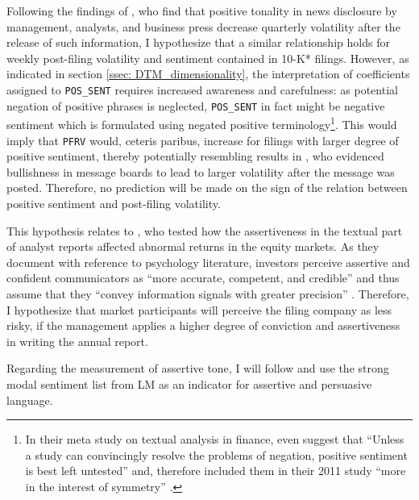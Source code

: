 Following the findings of \textcite{KothariLiShort_2009}, who find that positive tonality in news disclosure by management, analysts, and business press decrease quarterly volatility after the release of such information, I hypothesize that a similar relationship holds for weekly post-filing volatility and sentiment contained in 10-K* filings. However, as indicated in section \ref{ssec: DTM_dimensionality}, the interpretation of coefficients assigned to \texttt{POS\_SENT} requires increased awareness and carefulness: as potential negation of positive phrases is neglected, \texttt{POS\_SENT} in fact might be negative sentiment which is formulated using negated positive terminology\footnote{In their meta study on textual analysis in finance, \textcite{LM-meta-2016} even suggest that \enquote{Unless a study can convincingly resolve the problems of negation, positive sentiment is best left untested} \parencite[1217]{LM-meta-2016} and, therefore included them in their 2011 study \enquote{more in the interest of symmetry} \parencite[45]{Loughran2011}.}. This would imply that \texttt{PFRV} would, ceteris paribus, increase for filings with larger degree of positive sentiment, thereby potentially resembling results in \textcite{AntweilerFrank2004}, who evidenced bullishness in message boards to lead to larger volatility after the message was posted. Therefore, no prediction will be made on the sign of the relation between positive sentiment and post-filing volatility. 


This hypothesis relates to \textcite{HuangZangZheng14}, who tested how the assertiveness in the textual part of analyst reports affected abnormal returns in the equity markets. As they document with reference to psychology literature, investors perceive assertive and confident communicators as \enquote{more accurate, competent, and credible} and thus assume that they \enquote{convey information signals with greater precision} \parencite[2157]{HuangZangZheng14}. Therefore, I hypothesize that market participants will perceive the filing company as less risky, if the management applies a higher degree of conviction and assertiveness in writing the annual report.

Regarding the measurement of assertive tone, I will follow \textcite{HuangZangZheng14} and use the strong modal sentiment list from LM as an indicator for assertive and persuasive language. 

